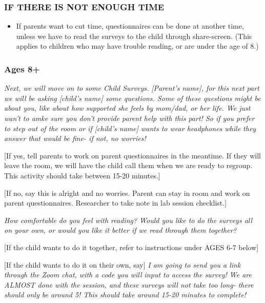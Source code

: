 \documentclass[]{book}
\providecommand{\tightlist}{%
  \setlength{\itemsep}{0pt}\setlength{\parskip}{0pt}}
\begin{document}
\hypertarget{if-there-is-not-enough-time}{%
\subsubsection{IF THERE IS NOT ENOUGH TIME}\label{if-there-is-not-enough-time}}

\begin{itemize}
\tightlist
\item
  If parents want to cut time, questionnaires can be done at another time, unless we have to read the surveys to the child through share-screen. (This applies to children who may have trouble reading, or are under the age of 8.)
\end{itemize}

\hypertarget{ages-8}{%
\subsubsection{Ages 8+}\label{ages-8}}

\emph{Next, we will move on to some Child Surveys. {[}Parent's name{]}, for this next part we will be asking {[}child's name{]} some questions. Some of these questions might be about you, like about how supported she feels by mom/dad, or her life. We just wan't to amke sure you don't provide parent help with this part! So if you prefer to step out of the room or if {[}child's name{]} wants to wear headphones while they answer that would be fine- if not, no worries!}

{[}If yes, tell parents to work on parent questionnaires in the meantime. If they will leave the room, we will have the child call them when we are ready to regroup. This activity should take between 15-20 minutes.{]}

{[}If no, say this is alright and no worries. Parent can stay in room and work on parent questionnaires. Researcher to take note in lab session checklist.{]}

\emph{How comfortable do you feel with reading? Would you like to do the surveys all on your own, or would you like it better if we read through them together?}

{[}If the child wants to do it together, refer to instructions under AGES 6-7 below{]}

{[}If the child wants to do it on their own, say{]} \emph{I am going to send you a link through the Zoom chat, with a code you will input to access the survey! We are ALMOST done with the session, and these surveys will not take too long- there should only be around 5! This should take around 15-20 minutes to complete!}
\end{document}
